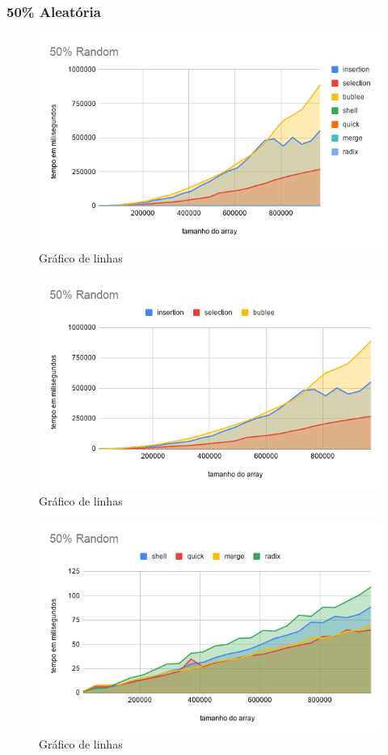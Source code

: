 \documentclass[a4paper, 12pt]{article}
\begin{document}
$  $  \\
 
\subsubsection{50\% Aleatória}
	\begin{figure}[!h]
	\caption{ Gráfico de linhas }
	\label{fig:50random1}
	\centering
	\includegraphics[width=1\textwidth, height=0.60\textwidth]{50Random}
	
\end{figure}
\begin{figure}[!h]
	\caption{ Gráfico de linhas }
	\label{fig:50random2}
	\centering
	\includegraphics[width=1\textwidth, height=0.57\textwidth]{50Random1}
\end{figure}

\begin{figure}[!h]
	\caption{ Gráfico de linhas }
	\label{fig:50random3}
	\centering
	\includegraphics[width=1\textwidth, height=0.57\textwidth]{50Random2}
\end{figure}
\newpage
\end{document}
